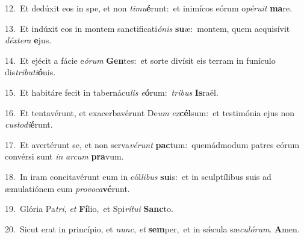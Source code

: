 {\numbfont\textcolor{\numbcolor}{12.}}~Et dedúxit eos in spe, et non \textit{ti}\-\textit{mu}\textbf{é}runt:~\star et inimícos eórum o\-\textit{pé}\-\textit{ru}\textit{it} \textbf{ma}\-re.\par
{\numbfont\textcolor{\numbcolor}{13.}}~Et indúxit eos in montem sanctificati\-\textit{ó}\-\textit{nis} \textbf{su}\-æ:~\star montem, quem acquisívit \textit{déx}\-\textit{te}\textit{ra} \textbf{e}\-jus.\par
{\numbfont\textcolor{\numbcolor}{14.}}~Et ejécit a fácie e\-\textit{ó}\-\textit{rum} \textbf{Gen}\-tes:~\star et sorte divísit eis terram in funículo dis\-\textit{tri}\-\textit{bu}\textit{ti}\textbf{ó}nis.\par
{\numbfont\textcolor{\numbcolor}{15.}}~Et habitáre fecit in tabernácu\textit{lis} \textit{e}\-\textbf{ó}rum:~\star \textit{tri}\-\textit{bus} \textbf{Is}\-raël.\par
{\numbfont\textcolor{\numbcolor}{16.}}~Et tentavérunt, et exacerbavérunt De\textit{um} \textit{ex}\-\textbf{cél}sum:~\star et testimónia ejus non \textit{cus}\-\textit{to}\textit{di}\textbf{é}runt.\par
{\numbfont\textcolor{\numbcolor}{17.}}~Et avertérunt se, et non serva\-\textit{vé}\-\textit{runt} \textbf{pac}\-tum:~\star quemádmodum patres eórum convérsi sunt \textit{in} \textit{ar}\-\textit{cum} \textbf{pra}\-vum.\par
{\numbfont\textcolor{\numbcolor}{18.}}~In iram concitavérunt eum in cól\-\textit{li}\-\textit{bus} \textbf{su}\-is:~\star et in sculptílibus suis ad æmulatiónem eum \textit{pro}\-\textit{vo}\textit{ca}\textbf{vé}runt.\par
{\numbfont\textcolor{\numbcolor}{19.}}~Glória Pa\-\textit{tri}\-, \textit{et} \textbf{Fí}\-lio,~\star et Spi\-\textit{rí}\-\textit{tu}\textit{i} \textbf{Sanc}\-to.\par
{\numbfont\textcolor{\numbcolor}{20.}}~Sicut erat in princípio, et \textit{nunc}\-, \textit{et} \textbf{sem}\-per,~\star et in sǽcula sæ\-\textit{cu}\-\textit{ló}\textit{rum}. \textbf{A}\-men.\par
